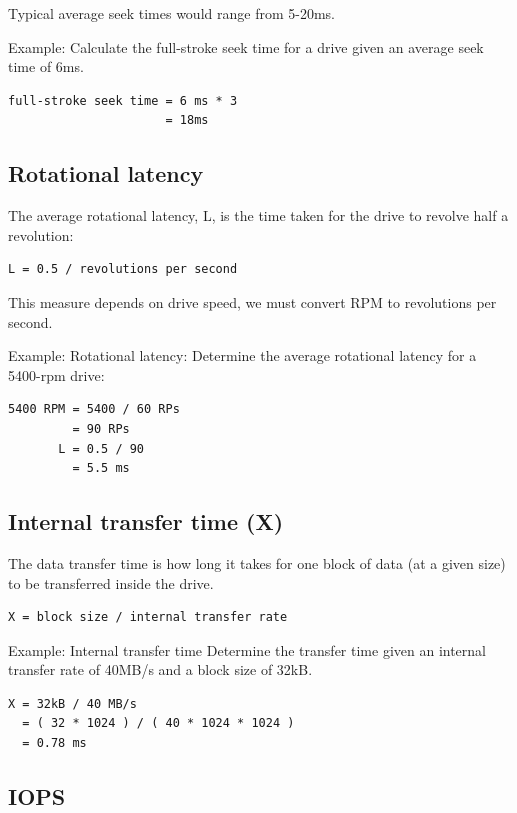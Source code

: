 Typical average seek times would range from 5-20ms.

Example: Calculate the full-stroke seek time for a drive given an
average seek time of 6ms.

\begin{verbatim}
full-stroke seek time = 6 ms * 3
                      = 18ms
\end{verbatim}

\subsection{Rotational latency}\label{rotational-latency}

The average rotational latency, L, is the time taken for the drive to
revolve half a revolution:

\begin{verbatim}
L = 0.5 / revolutions per second
\end{verbatim}

This measure depends on drive speed, we must convert RPM to revolutions
per second.

Example: Rotational latency: Determine the average rotational latency
for a 5400-rpm drive:

\begin{verbatim}
5400 RPM = 5400 / 60 RPs
         = 90 RPs
       L = 0.5 / 90 
         = 5.5 ms
\end{verbatim}

\subsection{Internal transfer time (X)}\label{internal-transfer-time-x}

The data transfer time is how long it takes for one block of data (at a
given size) to be transferred inside the drive.

\begin{verbatim}
X = block size / internal transfer rate
\end{verbatim}

Example: Internal transfer time Determine the transfer time given an
internal transfer rate of 40MB/s and a block size of 32kB.

\begin{verbatim}
X = 32kB / 40 MB/s
  = ( 32 * 1024 ) / ( 40 * 1024 * 1024 )
  = 0.78 ms
\end{verbatim}

\subsection{IOPS}\label{iops}

